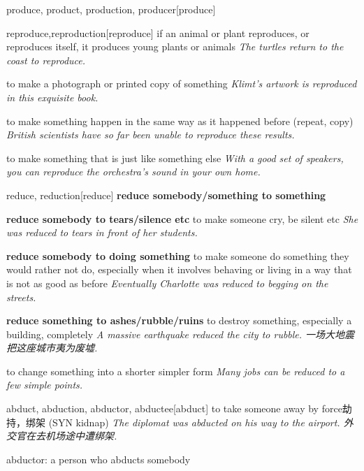 \begin{DefWord}{produce, product, production, producer}[produce]
\end{DefWord}

\begin{DefWord}{reproduce,reproduction}[reproduce]
    if an animal or plant reproduces, or reproduces itself, it produces young plants or animals
    \textit{The turtles return to the coast to reproduce.}

    to make a photograph or printed copy of something
    \textit{Klimt’s artwork is reproduced in this exquisite book.}

    to make something happen in the same way as it happened before (repeat, copy)
    \textit{British scientists have so far been unable to reproduce these results.}

    to make something that is just like something else
    \textit{With a good set of speakers, you can reproduce the orchestra’s sound in your own home.}
\end{DefWord}

\begin{DefWord}{reduce, reduction}[reduce]
    \textbf{reduce somebody/something to something}

    \textbf{reduce somebody to tears/silence etc} to make someone cry, be silent etc
    \textit{She was reduced to tears in front of her students.}

    \textbf{reduce somebody to doing something} to make someone do something they would rather not do, especially when it involves behaving or living in a way that is not as good as before
    \textit{Eventually Charlotte was reduced to begging on the streets.}

    \textbf{reduce something to ashes/rubble/ruins}
    to destroy something, especially a building, completely
    \textit{A massive earthquake reduced the city to rubble. 一场大地震把这座城市夷为废墟. }

    to change something into a shorter simpler form
    \textit{Many jobs can be reduced to a few simple points.}
\end{DefWord}

\begin{DefWord}{abduct, abduction, abductor, abductee}[abduct]
    to take someone away by force劫持，绑架 (SYN  kidnap)
    \textit{The diplomat was abducted on his way to the airport.  外交官在去机场途中遭绑架. }

    abductor: a person who abducts somebody
\end{DefWord}

